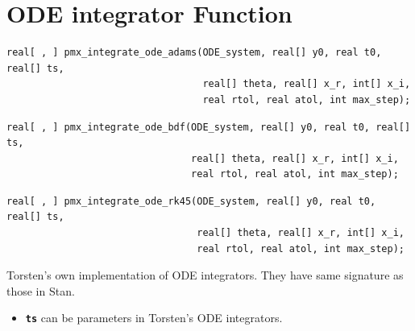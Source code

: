 \documentclass[10pt, reqno, oneside]{amsbook}
\numberwithin{equation}{chapter}
\numberwithin{figure}{chapter}
\numberwithin{table}{chapter}
\theoremstyle{remark}
\begin{document}
\section{ODE  integrator Function}
\label{sec:org28c48d6}
\begin{verbatim}
real[ , ] pmx_integrate_ode_adams(ODE_system, real[] y0, real t0, real[] ts,
                                  real[] theta, real[] x_r, int[] x_i,
                                  real rtol, real atol, int max_step);
\end{verbatim}
\begin{verbatim}
real[ , ] pmx_integrate_ode_bdf(ODE_system, real[] y0, real t0, real[] ts,
                                real[] theta, real[] x_r, int[] x_i,
                                real rtol, real atol, int max_step);
\end{verbatim}
\begin{verbatim}
real[ , ] pmx_integrate_ode_rk45(ODE_system, real[] y0, real t0, real[] ts,
                                 real[] theta, real[] x_r, int[] x_i,
                                 real rtol, real atol, int max_step);
\end{verbatim}
Torsten's own implementation of ODE integrators. They have same
signature as those in Stan.
\begin{itemize}
\item {\small \color{MRGGreen} \texttt{\textbf{ts}}} can be parameters in Torsten's ODE integrators.
\end{itemize}
\end{document}

